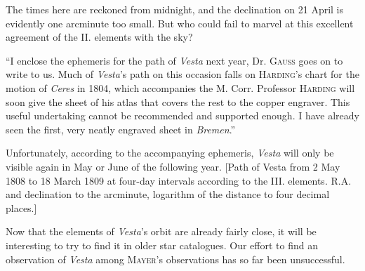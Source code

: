 \par\indent The times here are reckoned from midnight, and the declination on 21 April is evidently one arcminute too small. But who could fail to marvel at this excellent agreement of the II. elements with the sky?

\par\indent “I enclose the ephemeris for the path of \emph{Vesta} next year, Dr. \textsc{Gauss} goes on to write to us. Much of \emph{Vesta}’s path on this occasion falls on \textsc{Harding}’s chart for the motion of \emph{Ceres} in 1804, which accompanies the M. Corr. Professor \textsc{Harding} will soon give the sheet of his atlas that covers the rest to the copper engraver. This useful undertaking cannot be recommended and supported enough. I have already seen the first, very neatly engraved sheet in \emph{Bremen}.”

\par\indent Unfortunately, according to the accompanying ephemeris, \emph{Vesta} will only be visible again in May or June of the following year. [Path of Vesta from 2 May 1808 to 18 March 1809 at four-day intervals according to the III. elements. R.A. and declination to the arcminute, logarithm of the distance to four decimal places.]

\par\indent Now that the elements of \emph{Vesta}’s orbit are already fairly close, it will be interesting to try to find it in older star catalogues. Our effort to find an observation of \emph{Vesta} among \textsc{Mayer}’s observations has so far been unsuccessful.

\begin{flushright}
\end{flushright}

